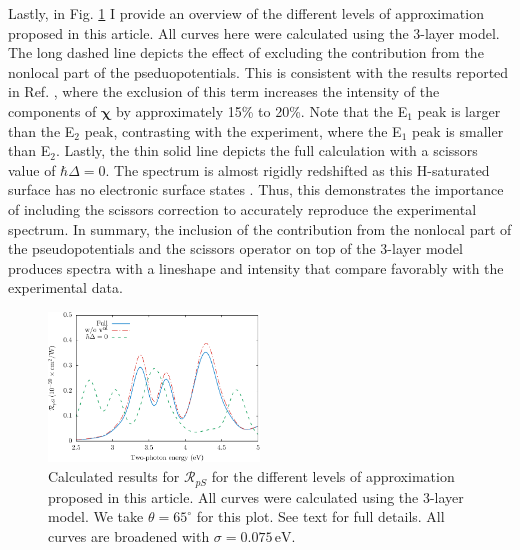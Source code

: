 Lastly, in Fig. \ref{fig:improvements} I provide an overview of the different levels of approximation proposed in this article. All curves here were calculated using the 3-layer model. The long dashed line depicts the effect of excluding the contribution from the nonlocal part of the pseduopotentials. This is consistent with the results reported in Ref. \cite{andersonPRB15}, where the exclusion of this term increases the intensity of the components of $\boldsymbol{\chi}$ by approximately 15\% to 20\%. Note that the E$_{1}$ peak is larger than the E$_{2}$ peak, contrasting with the experiment, where the E$_{1}$ peak is smaller than E$_{2}$. Lastly, the thin solid line depicts the full calculation with a scissors value of $\hbar\Delta = 0$. The spectrum is almost rigidly redshifted as this H-saturated surface has no electronic surface states \cite{andersonPRB15}. Thus, this demonstrates the importance of including the scissors correction to accurately reproduce the experimental spectrum. In summary, the inclusion of the contribution from the nonlocal part of the pseudopotentials and the scissors operator on top of the 3-layer model produces spectra with a lineshape and intensity that compare favorably with the experimental data.

\begin{figure}[H]
\centering
\includegraphics[width=0.5\textwidth]{content/figures/fig-Si1x1-Mejia_RpS_improvements}
\caption{Calculated results for $\mathcal{R}_{pS}$ for the different levels of approximation proposed in this article. All curves were calculated using the 3-layer model. We take $\theta=65^{\circ}$ for this plot. See text for full details. All curves are broadened with $\sigma=0.075\,\text{eV}$.}
\label{fig:improvements}
\end{figure}


\stopcontents[chapters]
